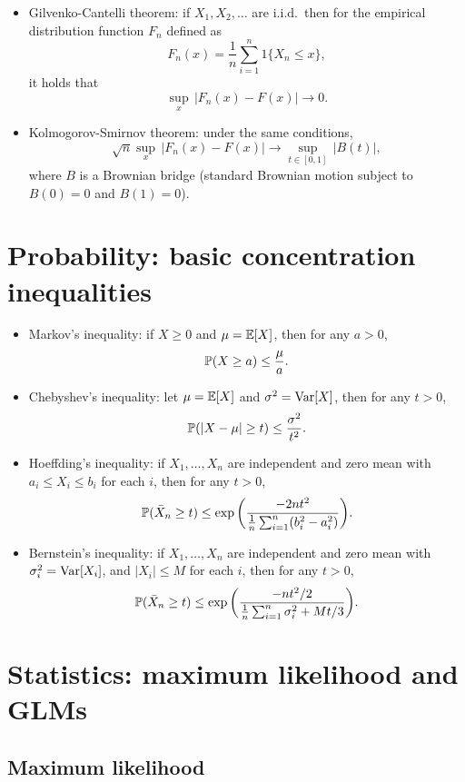 \documentclass{article}
\begin{document}
\begin{itemize}
\item Gilvenko-Cantelli theorem: if $X_1,X_2,\dots$ are i.i.d.\ then for the
  empirical distribution function $F_n$ defined as 
  \[
  F_n(x) = \frac{1}{n} \sum_{i=1}^n 1\{X_n \leq x\},
  \]
  it holds that
  \[
  \sup_x \, |F_n(x) - F(x)| \to 0.
  \]

\item Kolmogorov-Smirnov theorem: under the same conditions, 
  \[
  \sqrt{n} \sup_x \, |F_n(x) - F(x)| \to \sup_{t \in [0,1]} \, |B(t)|,
  \]
  where $B$ is a Brownian bridge (standard Brownian motion subject to $B(0) =
  0$ and $B(1) = 0$).   
\end{itemize}

\section{Probability: basic concentration inequalities} 

\begin{itemize}
\item Markov's inequality: if $X \geq 0$ and $\mu = \E[X]$, then for any
  $a > 0$, 
  \[
  \P(X \geq a) \leq \frac{\mu}{a}.
  \]
  
\item Chebyshev's inequality: let $\mu = \E[X]$ and $\sigma^2 = \Var[X]$, then 
  for any $t > 0$,  
  \[
  \P(|X - \mu| \geq t) \leq \frac{\sigma^2}{t^2}.
  \]

\item Hoeffding's inequality: if $X_1,\dots,X_n$ are independent and zero mean
  with $a_i \leq X_i \leq b_i$ for each $i$, then for any $t > 0$,
  \[
  \P( \bar{X}_n \geq t) \leq \exp\bigg( \frac{-2nt^2}{
    \frac{1}{n}\sum_{i=1}^n (b_i^2 - a_i^2)} \bigg).
  \]

\item Bernstein's inequality: if $X_1,\dots,X_n$ are independent and zero mean
  with $\sigma_i^2 = \Var[X_i]$, and $|X_i| \leq M$ for each $i$, then for any
  $t > 0$,  
  \[
  \P( \bar{X}_n \geq t) \leq \exp\bigg( \frac{-nt^2/2}{
    \frac{1}{n}\sum_{i=1}^n \sigma_i^2 + Mt/3} \bigg).
  \]
\end{itemize}

\section{Statistics: maximum likelihood and GLMs}

\subsection{Maximum likelihood}
\end{document}
